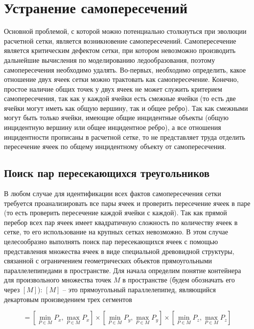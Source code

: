 \documentclass[
11pt,%
tightenlines,%
twoside,%
onecolumn,%
nofloats,%
nobibnotes,%
nofootinbib,%
superscriptaddress,%
noshowpacs,%
centertags]%
{revtex4}
\begin{document}

\section{Устранение самопересечений}

Основной проблемой, с которой можно потенциально столкнуться при эволюции расчетной сетки, является возникновение самопересечений.
Самопересечение является критическим дефектом сетки, при котором невозможно производить дальнейшие вычисления по моделированию ледообразования, поэтому самопересечения необходимо удалять.
Во-первых, необходимо определить, какое отношение двух ячеек сетки можно трактовать как самопересечение.
Конечно, простое наличие общих точек у двух ячеек не может служить критерием самопересечения, так как у каждой ячейки есть смежные ячейки (то есть две ячейки могут иметь как общую вершину, так и общее ребро).
Так как смежными могут быть только ячейки, имеющие общие инцидентные объекты (общую инцидентную вершину или общее инцидентное ребро), а все отношения инцидентности прописаны в расчетной сетке, то не представляет труда отделить пересечение ячеек по общему инцидентному объекту от самопересечения.

\subsection{Поиск пар пересекающихся треугольников}

В любом случае для идентификации всех фактов самопересечения сетки требуется проанализировать все пары ячеек и проверить пересечение ячеек в паре (то есть проверить пересечение каждой ячейки с каждой).
Так как прямой перебор всех пар ячеек имеет квадратичную сложность по количеству ячеек в сетке, то его использование на крупных сетках невозможно.
В этом случае целесообразно выполнять поиск пар пересекающихся ячеек с помощью представления множества ячеек в виде специальной древовидной структуры, связанной с ограничением геометрических объектов прямоугольными параллелепипедами в пространстве.
Для начала определим понятие контейнера для произвольного множества точек $M$ в пространстве (будем обозначать его через $[M]$): $[M]$ -- это прямоугольный параллелепипед, являющийся декартовым произведением трех сегментов

\begin{equation}
[M] = \left[\min_{P \in M}{P_x}, \max_{P \in M}{P_x}\right]
      \times \left[\min_{P \in M}{P_y}, \max_{P \in M}{P_y}\right]
      \times \left[\min_{P \in M}{P_z}, \max_{P \in M}{P_z}\right]
\end{equation}
\end{document}
